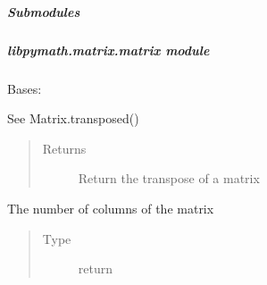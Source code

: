 \documentclass[letterpaper,10pt,english]{sphinxmanual}
\begin{document}
\subparagraph{Submodules}
\label{\detokenize{libpymath.matrix:submodules}}

\subparagraph{libpymath.matrix.matrix module}
\label{\detokenize{libpymath.matrix:module-libpymath.matrix.matrix}}\label{\detokenize{libpymath.matrix:libpymath-matrix-matrix-module}}

\begin{fulllineitems}
\label{\detokenize{libpymath.matrix:libpymath.matrix.matrix.Matrix}}
Bases: 

\begin{fulllineitems}
\label{\detokenize{libpymath.matrix:libpymath.matrix.matrix.Matrix.T}}
See Matrix.transposed()
\begin{quote}\begin{description}
\item[{Returns}] \leavevmode
Return the transpose of a matrix

\end{description}\end{quote}

\end{fulllineitems}


\begin{fulllineitems}
\label{\detokenize{libpymath.matrix:libpymath.matrix.matrix.Matrix.cols}}
The number of columns of the matrix
\begin{quote}\begin{description}
\item[{Type}] \leavevmode
return


\end{description}
\end{quote}
\end{fulllineitems}
\end{fulllineitems}
\end{document}
